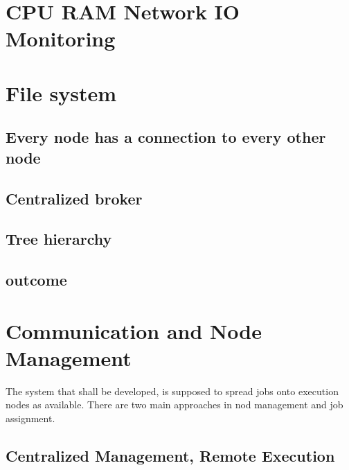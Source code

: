 






\section{CPU RAM Network IO Monitoring}

\section{File system}


\subsection{Every node has a connection to every other node}

\subsection{Centralized broker}

\subsection{Tree hierarchy}

\subsection{outcome}




\section{Communication and Node Management}

The system that shall be developed, is supposed to spread jobs onto execution nodes as available.
There are two main approaches in nod management and job assignment.



\subsection{Centralized Management, Remote Execution}

